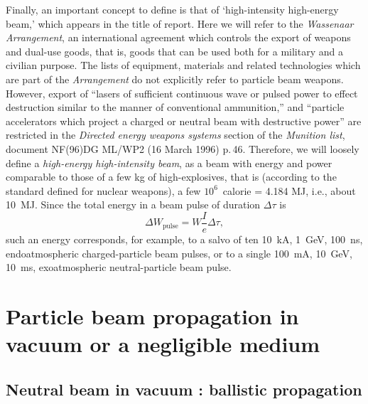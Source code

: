 \documentclass [12pt,a4paper,     ]{report} %
\begin{document}
   Finally, an important concept to define is that of `high-intensity high-energy beam,' which appears in the title of report.  Here we will refer to the \emph{Wassenaar Arrangement}, an international agreement which controls the export of weapons and dual-use goods, that is, goods that can be used both for a military and a civilian purpose.  The lists of equipment, materials and related technologies which are part of the \emph{Arrangement} do not explicitly refer to particle beam weapons.  However, export of ``lasers of sufficient continuous wave or pulsed power to effect destruction similar to the manner of conventional ammunition,'' and ``particle accelerators which project a charged or neutral beam with destructive power'' are restricted in the \emph{Directed energy weapons systems} section of the \emph{Munition list}, document NF(96)DG ML/WP2 (16 March 1996) p.\,46.  Therefore, we will loosely define a \emph{high-energy high-intensity beam}, as a beam with energy and power comparable to those of a few kg of high-explosives, that is (according to the standard defined for nuclear weapons), a few $10^6$~calorie = 4.184 MJ, i.e., about 10~MJ.  Since the total energy in a beam pulse of duration $\Delta \tau$ is
%
\begin{equation}\label{def:17} %
     \Delta W_{\text{pulse}} = W \frac{I}{e} \Delta \tau,
\end{equation}
%
such an energy corresponds, for example, to a salvo of ten 10~kA, 1~GeV, 100~ns, endoatmospheric charged-particle beam pulses, or to a single 100~mA, 10~GeV, 10~ms, exoatmospheric neutral-particle beam pulse.


\newpage



\chapter{Particle beam propagation in vacuum or a negligible medium}

\section{Neutral beam in vacuum : ballistic propagation}
\label{neu:0} 
\end{document}
